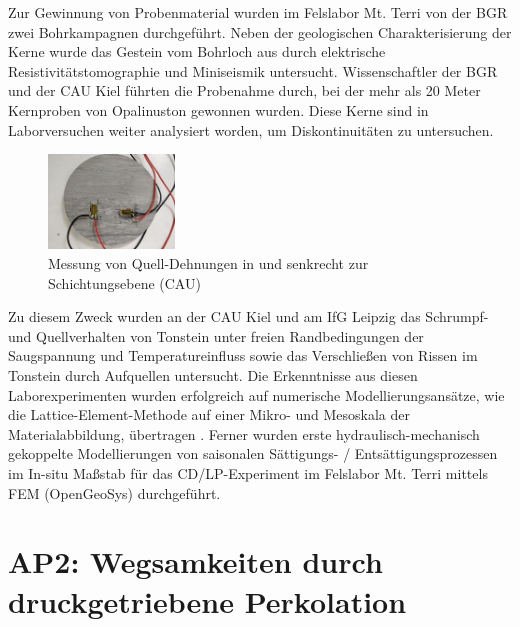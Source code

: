 Zur Gewinnung von Probenmaterial wurden im Felslabor Mt. Terri von der BGR zwei Bohrkampagnen durchgeführt. Neben der geologischen Charakterisierung der Kerne wurde das Gestein vom Bohrloch aus durch elektrische Resistivitätstomographie und Miniseismik untersucht. Wissenschaftler der BGR und der CAU Kiel führten die Probenahme durch, bei der mehr als 20 Meter Kernproben von Opalinuston gewonnen wurden. Diese Kerne sind in Laborversuchen weiter analysiert worden, um Diskontinuitäten zu untersuchen. 
\begin{figure}
\includegraphics[width=0.3\textwidth]{figures/CAU_shrink_exp_01.jpg}
\caption{Messung von Quell-Dehnungen in und senkrecht zur Schichtungsebene (CAU)}
\label{fig:wp1}
\end{figure}
Zu diesem Zweck wurden an der CAU Kiel und am IfG Leipzig das Schrumpf- und Quellverhalten von Tonstein unter freien Randbedingungen der Saugspannung und Temperatureinfluss sowie das Verschlie{\ss}en von Rissen im Tonstein durch Aufquellen untersucht. Die Erkenntnisse aus diesen Laborexperimenten wurden erfolgreich auf numerische Modellierungsansätze, wie die Lattice-Element-Methode auf einer Mikro- und Mesoskala der Materialabbildung, übertragen \cite{Sattari2019266, Shrestha20191671,Rizvi2020}. Ferner wurden erste hydraulisch-mechanisch gekoppelte Modellierungen von saisonalen Sättigungs- / Entsättigungsprozessen im In-situ Ma{\ss}stab für das CD/LP-Experiment im Felslabor Mt. Terri mittels FEM (OpenGeoSys) durchgeführt.

\section*{AP2: Wegsamkeiten durch druckgetriebene Perkolation}
\label{sec:wp2}

